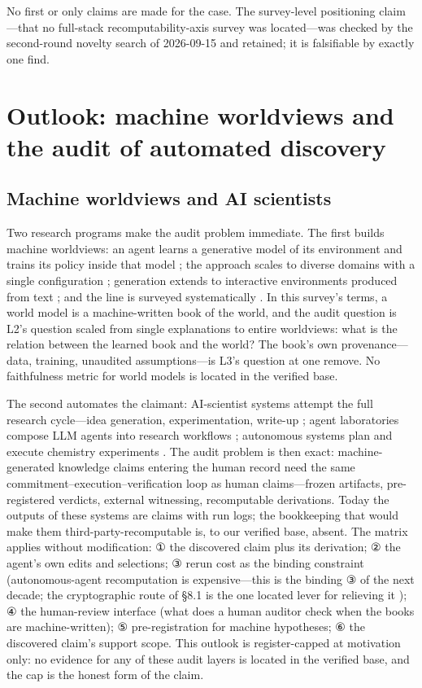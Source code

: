 \documentclass[11pt,a4paper]{article}
\begin{document}
No first or only claims are made for the case. The survey-level positioning claim—that no full-stack recomputability-axis survey was located—was checked by the second-round novelty search of 2026-09-15 and retained; it is falsifiable by exactly one find.

\section{Outlook: machine worldviews and the audit of automated discovery}

\subsection{Machine worldviews and AI scientists}

Two research programs make the audit problem immediate. The first builds machine worldviews: an agent learns a generative model of its environment and trains its policy inside that model \cite{key55}; the approach scales to diverse domains with a single configuration \cite{key56}; generation extends to interactive environments produced from text \cite{key57}; and the line is surveyed systematically \cite{key58}. In this survey's terms, a world model is a machine-written book of the world, and the audit question is L2's question scaled from single explanations to entire worldviews: what is the relation between the learned book and the world? The book's own provenance—data, training, unaudited assumptions—is L3's question at one remove. No faithfulness metric for world models is located in the verified base.

The second automates the claimant: AI-scientist systems attempt the full research cycle—idea generation, experimentation, write-up \cite{key59}; agent laboratories compose LLM agents into research workflows \cite{key60}; autonomous systems plan and execute chemistry experiments \cite{key61}. The audit problem is then exact: machine-generated knowledge claims entering the human record need the same commitment–execution–verification loop as human claims—frozen artifacts, pre-registered verdicts, external witnessing, recomputable derivations. Today the outputs of these systems are claims with run logs; the bookkeeping that would make them third-party-recomputable is, to our verified base, absent. The matrix applies without modification: ① the discovered claim plus its derivation; ② the agent's own edits and selections; ③ rerun cost as the binding constraint (autonomous-agent recomputation is expensive—this is the binding ③ of the next decade; the cryptographic route of §8.1 is the one located lever for relieving it \cite{key53}); ④ the human-review interface (what does a human auditor check when the books are machine-written); ⑤ pre-registration for machine hypotheses; ⑥ the discovered claim's support scope. This outlook is register-capped at motivation only: no evidence for any of these audit layers is located in the verified base, and the cap is the honest form of the claim.
\end{document}
